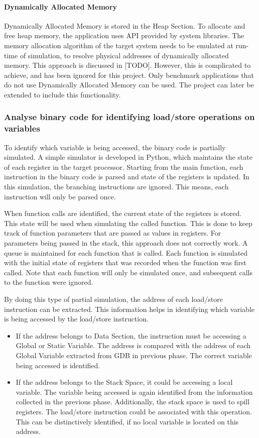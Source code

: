 \paragraph{Dynamically Allocated Memory}
Dynamically Allocated Memory is stored in the Heap Section. To allocate and free heap memory, the application uses API provided by system libraries. The memory allocation algorithm of the target system needs to be emulated at run-time of simulation, to resolve physical addresses of dynamically allocated memory. This approach is discussed in [TODO]. However, this is complicated to achieve, and has been ignored for this project. Only benchmark applications that do not use Dynamically Allocated Memory can be used. The project can later be extended to include this functionality.

\subsubsection{Analyse binary code for identifying load/store operations on variables}
To identify which variable is being accessed, the binary code is partially simulated. A simple simulator is developed in Python, which maintains the state of each register in the target processor. Starting from the main function, each instruction in the binary code is parsed and state of the registers is updated. In this simulation, the branching instructions are ignored. This means, each instruction will only be parsed once. 

When function calls are identified, the current state of the registers is stored. This state will be used when simulating the called function. This is done to keep track of function parameters that are passed as values in registers. For parameters being passed in the stack, this approach does not correctly work. A queue is maintained for each function that is called. Each function is simulated with the initial state of registers that was recorded when the function was first called. Note that each function will only be simulated once, and subsequent calls to the function were ignored.

By doing this type of partial simulation, the address of each load/store instruction can be extracted. This information helps in identifying which variable is being accessed by the load/store instruction. 

\begin{itemize}
\item If the address belongs to Data Section, the instruction must be accessing a Global or Static Variable. The address is compared with the address of each Global Variable extracted from GDB in previous phase. The correct variable being accessed is identified. 
\item If the address belongs to the Stack Space, it could be accessing a local variable. The variable being accessed is again identified from the information collected in the previous phase. Additionally, the stack space is used to spill registers. The load/store instruction could be associated with this operation. This can be distinctively identified, if no local variable is located on this address.
\end{itemize}

